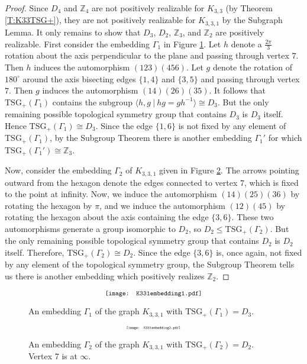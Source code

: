 \documentclass[11]{amsart}
\def\Z{\mathbb{Z}}
\def\TSG{{\mathrm{TSG}}}
\theoremstyle{definition}
\theoremstyle{remark}
\begin{document}
\begin{proof}  
Since $D_4$ and $\Z_4$ are not positively realizable for $K_{3,3}$ (by Theorem \ref{T:K33TSG+}), they are not positively realizable for $K_{3,3,1}$ by the Subgraph Lemma.  It only remains to show that $D_3$, $D_2$, $\mathbb{Z}_3$, and $\mathbb{Z}_2$ are positively realizable.  First consider the embedding $\Gamma_1$ in Figure \ref{F:K331D3}.  Let $h$ denote a $\frac{2\pi}{3}$ rotation about the axis perpendicular to the plane and passing through vertex $7$.  Then $h$ induces the automorphism $(123)(456)$.  Let $g$ denote the rotation of $180^{\circ}$ around the axis bisecting edges $\{1,4\}$ and $\{3,5\}$ and passing through vertex $7$. Then $g$ induces the automorphism $(14)(26)(35)$.  It follows that $\TSG_+(\Gamma_1)$ contains the subgroup $\langle h, g \  | \ hg=gh^{-1} \rangle \cong D_3$. But the only remaining possible topological symmetry group that contains $D_3$ is $D_3$ itself.  Hence $\TSG_+(\Gamma_1) \cong D_3$.  Since the edge $\{1,6\}$ is not fixed by any element of $\TSG_+(\Gamma_1)$, by the Subgroup Theorem there is another embedding $\Gamma_1'$ for which $\TSG_+(\Gamma_1') \cong \Z_3$.

Now, consider the embedding $\Gamma_2$ of $K_{3,3,1}$ given in Figure \ref{F:K331D2}. The arrows pointing outward from the hexagon denote the edges connected to vertex $7$, which is fixed to the point at infinity. Now, we induce the automorphism $(14)(25)(36)$ by rotating the hexagon by $\pi$, and we induce the automorphism $(12)(45)$ by rotating the hexagon about the axis containing the edge $\{3,6\}$. These two automorphisms generate a group isomorphic to $D_2$, so $D_2 \leq \TSG_+(\Gamma_2)$. But the only remaining possible topological symmetry group that contains $D_2$ is $D_2$ itself. Therefore, $\TSG_+(\Gamma_2) \cong D_2$. Since the edge $\{3,6\}$ is, once again, not fixed by any element of the topological symmetry group, the Subgroup Theorem tells us there is another embedding which positively realizes $\Z_2$.
\end{proof}

    \begin{figure} [htbp]
$$\scalebox{.8}{\texttt{[image: K331embedding1.pdf]}}$$
\caption{An embedding $\Gamma_1$ of the graph $K_{3,3,1}$ with $ \TSG_+(\Gamma_1) = D_3$.}
\label{F:K331D3}
\end{figure}

    \begin{figure} [htbp]
$$\scalebox{.45}{\texttt{[image: K331embedding2.pdf]}}$$
\caption{An embedding $\Gamma_2$ of the graph $K_{3,3,1}$ with $ \TSG_+(\Gamma_2) = D_2$. Vertex 7 is at $\infty$.}
\label{F:K331D2}
\end{figure}
\end{document}
